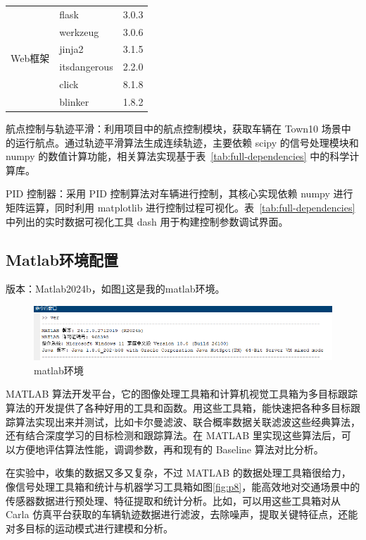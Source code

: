 \begin{table}[htbp]
\begin{tabular}{lll}
		\hline
		\multirow{6}{*}{Web框架}
		& flask & 3.0.3 \\
		& werkzeug & 3.0.6 \\
		& jinja2 & 3.1.5 \\
		& itsdangerous & 2.2.0 \\
		& click & 8.1.8 \\
		& blinker & 1.8.2 \\
		
		
		
		\hline
	\end{tabular}
\end{table}

航点控制与轨迹平滑：利用项目中的航点控制模块，获取车辆在 Town10 场景中的运行航点。通过轨迹平滑算法生成连续轨迹，主要依赖 scipy 的信号处理模块和 numpy 的数值计算功能，相关算法实现基于表~\ref{tab:full-dependencies} 中的科学计算库。

PID 控制器：采用 PID 控制算法对车辆进行控制，其核心实现依赖 numpy 进行矩阵运算，同时利用 matplotlib 进行控制过程可视化。表~\ref{tab:full-dependencies} 中列出的实时数据可视化工具 dash 用于构建控制参数调试界面。

\subsection{Matlab环境配置}

版本：Matlab2024b，如图\ref{fig:p7}这是我的matlab环境。


\begin{figure}[htbp] %
	\centering
	\includegraphics[width=1\textwidth]{p7} %
	\caption{matlab环境} %
	\label{fig:p7} %
\end{figure}


MATLAB 算法开发平台，它的图像处理工具箱和计算机视觉工具箱为多目标跟踪算法的开发提供了各种好用的工具和函数。用这些工具箱，能快速把各种多目标跟踪算法实现出来并测试，比如卡尔曼滤波、联合概率数据关联滤波这些经典算法，还有结合深度学习的目标检测和跟踪算法。在 MATLAB 里实现这些算法后，可以方便地评估算法性能，调调参数，再和现有的 Baseline 算法对比分析。

在实验中，收集的数据又多又复杂，不过 MATLAB 的数据处理工具箱很给力，像信号处理工具箱和统计与机器学习工具箱如图\ref{fig:p8}，能高效地对交通场景中的传感器数据进行预处理、特征提取和统计分析。比如，可以用这些工具箱对从 Carla 仿真平台获取的车辆轨迹数据进行滤波，去除噪声，提取关键特征点，还能对多目标的运动模式进行建模和分析。



